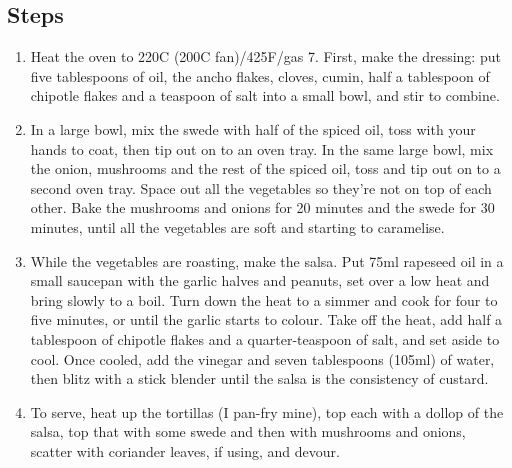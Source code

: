 \documentclass{book}
\begin{document}
\subsection*{Steps}
\begin{enumerate}
\item Heat the oven to 220C (200C fan)/425F/gas 7. First, make the dressing: put five tablespoons of oil, the ancho flakes, cloves, cumin, half a tablespoon of chipotle flakes and a teaspoon of salt into a small bowl, and stir to combine.
\item In a large bowl, mix the swede with half of the spiced oil, toss with your hands to coat, then tip out on to an oven tray. In the same large bowl, mix the onion, mushrooms and the rest of the spiced oil, toss and tip out on to a second oven tray. Space out all the vegetables so they’re not on top of each other. Bake the mushrooms and onions for 20 minutes and the swede for 30 minutes, until all the vegetables are soft and starting to caramelise.
\item While the vegetables are roasting, make the salsa. Put 75ml rapeseed oil in a small saucepan with the garlic halves and peanuts, set over a low heat and bring slowly to a boil. Turn down the heat to a simmer and cook for four to five minutes, or until the garlic starts to colour. Take off the heat, add half a tablespoon of chipotle flakes and a quarter-teaspoon of salt, and set aside to cool. Once cooled, add the vinegar and seven tablespoons (105ml) of water, then blitz with a stick blender until the salsa is the consistency of custard.
\item To serve, heat up the tortillas (I pan-fry mine), top each with a dollop of the salsa, top that with some swede and then with mushrooms and onions, scatter with coriander leaves, if using, and devour.
\end{enumerate}
\newpage
\end{document}
